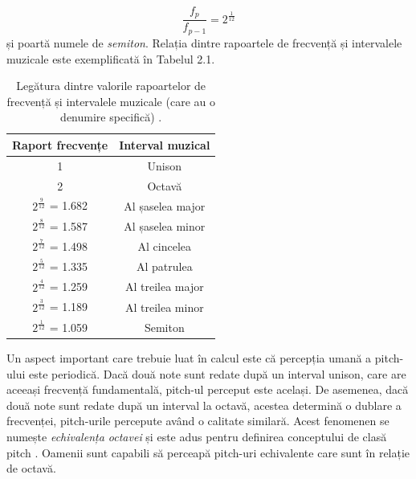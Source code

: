 \documentclass[a4paper,12pt]{report}
\begin{document}
\begin{equation*}
    \frac{f_p}{f_{p-1}} = 2^{\frac{1}{12}}
\end{equation*}
și poartă numele de \emph{semiton}. Relația dintre rapoartele de 
frecvență și intervalele muzicale este exemplificată în 
Tabelul 2.1.

\begin{table}[h!]
    \begin{center}
        \begin{tabular}{ | c | c | }
            \hline 
                Raport frecvențe & Interval muzical \\ 
                \hline \hline 
                1 & Unison \\
                \hline  
                2 & Octavă \\
                \hline 
                $2^{\frac{9}{12}}$ = 1.682 & Al șaselea major \\
                \hline
                $2^{\frac{8}{12}}$ = 1.587 & Al șaselea minor \\
                \hline
                $2^{\frac{7}{12}}$ = 1.498 & Al cincelea \\
                \hline
                $2^{\frac{5}{12}}$ = 1.335 & Al patrulea \\
                \hline
                $2^{\frac{4}{12}}$ = 1.259 & Al treilea major \\
                \hline
                $2^{\frac{3}{12}}$ = 1.189 & Al treilea minor \\
                \hline
                $2^{\frac{1}{12}}$ = 1.059 & Semiton \\
            \hline
        \end{tabular}
        \caption{Legătura dintre valorile rapoartelor de frecvență și intervalele muzicale 
        (care au o denumire specifică) \cite{Bonvini-Recognition}.}
    \end{center}
\end{table}

Un aspect important care trebuie luat în calcul este că percepția umană
a pitch-ului este periodică. Dacă două note sunt redate după 
un interval unison, care are aceeași frecvență fundamentală, pitch-ul 
perceput este același. De asemenea, dacă două note sunt redate 
după un interval la octavă, acestea determină o dublare a frecvenței, 
pitch-urile percepute având o calitate similară. Acest fenomenen 
se numește \emph{echivalența octavei} și este adus pentru definirea 
conceptului de clasă pitch \cite{Bonvini-Recognition}. Oamenii sunt capabili să perceapă pitch-uri
echivalente care sunt în relație de octavă.
\end{document}
